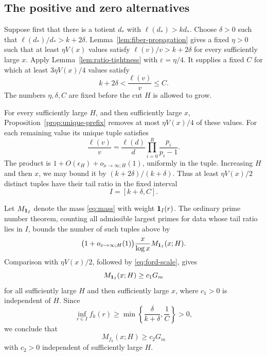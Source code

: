 \subsection{The positive and zero alternatives}

Suppose first that there is a totient \(d_*\) with
\(\ell(d_*)>kd_*\).  Choose \(\delta>0\) such that
\(\ell(d_*)/d_*>k+2\delta\).
Lemma~\ref{lem:fiber-propagation} gives a fixed \(\eta>0\) such that
at least \(\eta V(x)\) values satisfy
\(\ell(v)/v>k+2\delta\) for every sufficiently large \(x\).
Apply Lemma~\ref{lem:ratio-tightness} with \(\varepsilon=\eta/4\).
It supplies a fixed \(C\) for which at least
\(3\eta V(x)/4\) values satisfy
\begin{equation}\label{eq:bounded-positive-ratios}
 k+2\delta<\frac{\ell(v)}v\leq C.
\end{equation}
The numbers \(\eta,\delta,C\) are fixed before the cut \(H\) is
allowed to grow.

For every sufficiently large \(H\), and then sufficiently large \(x\),
Proposition~\ref{prop:unique-prefix} removes at most \(\eta V(x)/4\)
of these values.  For each remaining value its unique tuple satisfies
\[
 \frac{\ell(v)}v=\frac{\ell(d)}d
                 \prod_{i=0}^R\frac{p_i}{p_i-1}.
\]
The product is \(1+O(\epsilon_H)+o_{x\to\infty;H}(1)\), uniformly
in the tuple.  Increasing \(H\) and then \(x\), we may bound it by
\((k+2\delta)/(k+\delta)\).  Thus at least \(\eta V(x)/2\)
distinct tuples have their tail ratio in the fixed interval
\[
 I=[k+\delta,C].
\]

Let \(M_{\mathbf 1_I}\) denote the mass \eqref{eq:mass} with weight
\(\mathbf 1_I(r)\).  The ordinary prime number theorem, counting all
admissible largest primes for data whose tail ratio lies in \(I\),
bounds the number of such tuples above by
\[
 \bigl(1+o_{x\to\infty;H}(1)\bigr)
       \frac{x}{\log x}M_{\mathbf 1_I}(x;H).
\]
Comparison with \(\eta V(x)/2\), followed by
\eqref{eq:ford-scale}, gives
\[
 M_{\mathbf 1_I}(x;H)\geq c_1G_m
\]
for all sufficiently large \(H\) and then sufficiently large \(x\),
where \(c_1>0\) is independent of \(H\).  Since
\[
 \inf_{r\in I}f_k(r)
      \geq\min\left\{\frac{\delta}{k+\delta},\frac1C\right\}>0,
\]
we conclude that
\begin{equation}\label{eq:weighted-mass-positive}
 M_{f_k}(x;H)\geq c_2G_m
\end{equation}
with \(c_2>0\) independent of sufficiently large \(H\).

